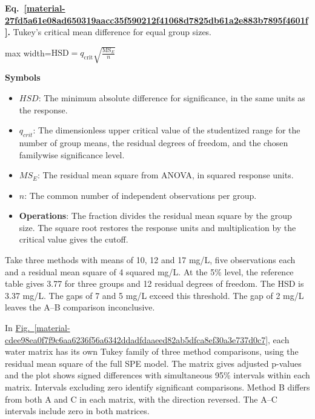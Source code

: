 \documentclass[11pt,a4paper]{article}
\begin{document}
\par\medskip
\noindent\begin{minipage}{\linewidth}
\label{material-27fd5a61e08ad650319aacc35f590212f41068d7825db61a2e883b7895f4601f}
\noindent\textbf{Eq.~\ref*{material-27fd5a61e08ad650319aacc35f590212f41068d7825db61a2e883b7895f4601f}.} Tukey’s critical mean difference for equal group sizes.\par\nopagebreak
\begin{center}\begin{adjustbox}{max width=\linewidth}$\displaystyle \mathrm{HSD}=q_{\mathrm{crit}}\sqrt{\frac{\mathrm{MS}_E}{n}}$\end{adjustbox}\end{center}

\par\noindent\textbf{Symbols}

\begin{itemize}\setlength{\itemsep}{1pt}\setlength{\parsep}{0pt}
\item \textbf{\(HSD\)}: The minimum absolute difference for significance, in the same units as the response.
\item \textbf{\(q_{crit}\)}: The dimensionless upper critical value of the studentized range for the number of group means, the residual degrees of freedom, and the chosen familywise significance level.
\item \textbf{\(MS_E\)}: The residual mean square from ANOVA, in squared response units.
\item \textbf{\(n\)}: The common number of independent observations per group.
\item \textbf{Operations}: The fraction divides the residual mean square by the group size. The square root restores the response units and multiplication by the critical value gives the cutoff.
\end{itemize}

\end{minipage}\par
\medskip

Take three methods with means of 10, 12 and 17 mg/L, five observations each and a residual mean square of 4 squared mg/L. At the 5\% level, the reference table gives 3.77 for three groups and 12 residual degrees of freedom. The HSD is 3.37 mg/L. The gaps of 7 and 5 mg/L exceed this threshold. The gap of 2 mg/L leaves the A–B comparison inconclusive.


In \hyperref[material-cdee98ea0f7f9c6aa6236f56a6342ddadfdaaeed82ab5dfca8ef30a3e737d0c7]{Fig.~\ref*{material-cdee98ea0f7f9c6aa6236f56a6342ddadfdaaeed82ab5dfca8ef30a3e737d0c7}}, each water matrix has its own Tukey family of three method comparisons, using the residual mean square of the full SPE model. The matrix gives adjusted p-values and the plot shows signed differences with simultaneous 95\% intervals within each matrix. Intervals excluding zero identify significant comparisons. Method B differs from both A and C in each matrix, with the direction reversed. The A–C intervals include zero in both matrices.
\end{document}
